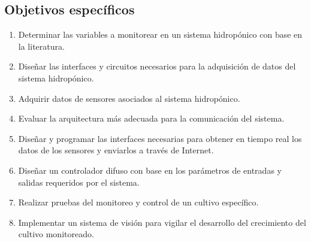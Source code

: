 \subsection{Objetivos específicos} \label{chap:oespecificos}
\begin{enumerate}
\item Determinar las variables a monitorear en un sistema hidropónico con base en la literatura.
\item Diseñar las interfaces y circuitos necesarios para la adquisición de datos del sistema hidropónico.
\item Adquirir datos de sensores asociados al sistema hidropónico.
\item Evaluar la arquitectura más adecuada para la comunicación del sistema.
\item Diseñar y programar las interfaces necesarias para obtener en tiempo real los datos de los sensores y enviarlos a través de Internet.
\item Diseñar un controlador difuso con base en los parámetros de entradas y salidas requeridos por el sistema. %
\item Realizar pruebas del monitoreo y control de un cultivo específico.
\item Implementar un sistema de visión para vigilar el desarrollo del crecimiento del cultivo monitoreado.

\end{enumerate}


